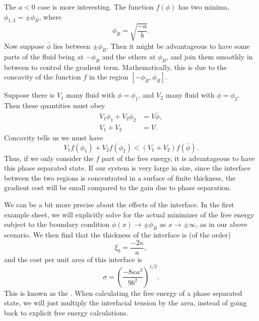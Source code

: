 \documentclass[a4paper]{article}
\begin{document}
The $a < 0$ case is more interesting. The function $f(\phi)$ has two minima, $\phi_{1, 2} = \pm \phi_B$, where
\[
  \phi_B = \sqrt{\frac{-a}{b}}.
\]
Now suppose $\bar{\phi}$ lies between $\pm \phi_B$. Then it might be advantageous to have some parts of the fluid being at $-\phi_B$ and the others at $\phi_B$, and join them smoothly in between to control the gradient term. Mathematically, this is due to the concavity of the function $f$ in the region $[-\phi_B, \phi_B]$.

Suppose there is $V_1$ many fluid with $\phi = \phi_1$, and $V_2$ many fluid with $\phi = \phi_2$. Then these quantities must obey
\begin{align*}
  V_1 \phi_1 + V_2 \phi_2 &= V \bar{\phi},\\
  V_1 + V_2 &= V.
\end{align*}
Concavity tells us we must have
\[
  V_1 f(\phi_1) + V_2 f(\phi_2) < (V_1 + V_2) f(\bar{\phi}).
\]
Thus, if we only consider the $f$ part of the free energy, it is advantageous to have this phase separated state. If our system is very large in size, since the interface between the two regions is concentrated in a surface of finite thickness, the gradient cost will be small compared to the gain due to phase separation.

We can be a bit more precise about the effects of the interface. In the first example sheet, we will explicitly solve for the actual minimizer of the free energy subject to the boundary condition $\phi(x) \to \pm \phi_B$ as $x \to \pm \infty$, as in our above scenario. We then find that the thickness of the interface is (of the order)
\[
  \xi_0 = \frac{-2 \kappa}{a},
\]
and the cost per unit area of this interface is
\[
  \sigma = \left(\frac{-8 \kappa a^3}{9 b^2}\right)^{1/2}.
\]
This is known as the . When calculating the free energy of a phase separated state, we will just multiply the interfacial tension by the area, instead of going back to explicit free energy calculations.
\end{document}
